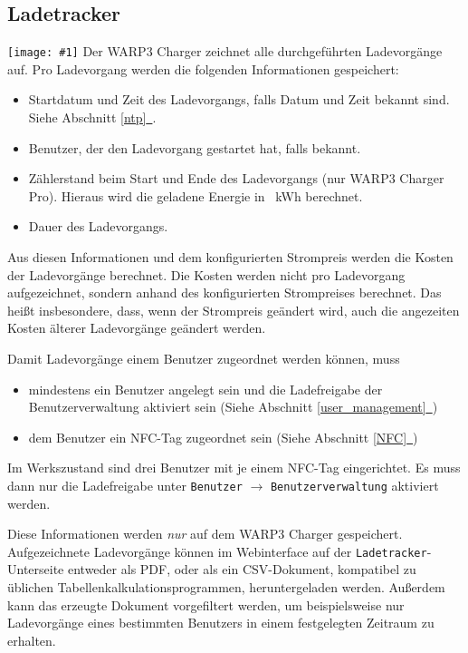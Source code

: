 \documentclass[a4paper,10pt]{article}
\newcommand{\hint}[1]{\begin{tcolorbox}[colback=boxgray,colframe=black,coltext=
white,title=Hinweis,left*=2mm,right*=2mm,boxsep=1mm,bottom=1mm,top=1mm]#1\end{tcolorbox}}
\newcommand{\gfx}[1]{\texttt{[image: \#1]}}
\newcommand*{\fullref}[1]{Abschnitt \hyperref[{#1}]{\ref*{#1}~\nameref*{#1}}}
\begin{document}
\begin{multicols*}{2}
    \newpage
    \section{Ladetracker}\label{charge_tracker}
    \gfx{./img_warp3/resized/web_charge_tracker}
    Der WARP3 Charger zeichnet alle durchgeführten Ladevorgänge auf. Pro Ladevorgang werden die folgenden Informationen gespeichert:
    \begin{itemize}
     \item Startdatum und Zeit des Ladevorgangs, falls Datum und Zeit bekannt
     sind. Siehe \fullref{ntp}.
     \item Benutzer, der den Ladevorgang gestartet hat, falls bekannt.
     \item Zählerstand beim Start und Ende des Ladevorgangs (nur WARP3 Charger Pro). Hieraus wird die geladene Energie in \SI{}{\kWh} berechnet.
     \item Dauer des Ladevorgangs.
    \end{itemize}
    Aus diesen Informationen und dem konfigurierten Strompreis werden die Kosten der Ladevorgänge berechnet. Die Kosten werden nicht pro Ladevorgang aufgezeichnet, sondern anhand des konfigurierten Strompreises berechnet. Das heißt insbesondere, dass, wenn der Strompreis geändert wird, auch die angezeiten Kosten älterer Ladevorgänge geändert werden.

    \hint{Damit Ladevorgänge einem Benutzer zugeordnet werden können, muss
        \begin{itemize}
            \item mindestens ein Benutzer angelegt sein und die Lade­freigabe der Benutzerverwaltung aktiviert sein (Siehe \fullref{user_management})
            \item dem Benutzer ein NFC-Tag zugeordnet sein (Siehe \fullref{NFC})
        \end{itemize}
        Im Werkszustand sind drei Benutzer mit je einem NFC-Tag eingerichtet. Es muss dann nur die Lade­freigabe unter \texttt{Benutzer} $\rightarrow$ \texttt{Benutzerverwaltung} aktiviert werden.
    }

    Diese Informationen werden \textit{nur} auf dem WARP3 Charger gespeichert.
    Aufgezeichnete Ladevorgänge können im Webinterface auf der \texttt{Ladetracker}-Unterseite entweder als PDF, oder als ein CSV-Dokument,
    kompatibel zu üblichen Tabellenkalkulationsprogrammen, heruntergeladen werden. Außerdem kann das erzeugte Dokument
    vorgefiltert werden, um beispielsweise nur Ladevorgänge eines bestimmten Benutzers in einem festgelegten Zeitraum zu erhalten.


\end{multicols*}
\end{document}
